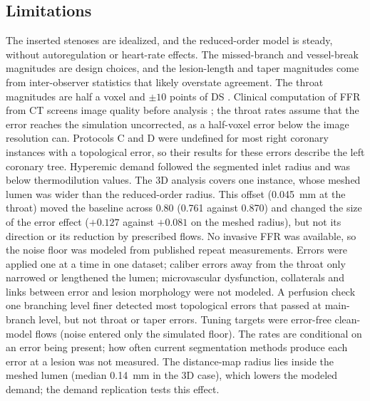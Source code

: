 \documentclass[journal,twoside,web]{ieeecolor}
\begin{document}
\subsection{Limitations}
The inserted stenoses are idealized, and the reduced-order model is steady, without autoregulation or heart-rate
effects. The missed-branch and vessel-break magnitudes are design choices, and the lesion-length and taper magnitudes come from
inter-observer statistics that likely overstate agreement. The throat magnitudes are half a voxel and $\pm 10$ points of DS \cite{boogers2010,gouya2009}. Clinical computation of FFR from CT screens image quality before analysis \cite{norgaard2014}; the throat rates assume that the error reaches the simulation uncorrected, as a half-voxel error below
the image resolution can. Protocols C and D were undefined for most right coronary
instances with a topological error, so their results for these errors describe the left coronary tree. Hyperemic
demand followed the segmented inlet radius and was below thermodilution values. The 3D analysis covers one instance, whose meshed lumen was wider than the reduced-order radius. This offset (0.045~mm at the throat) moved the baseline across 0.80 (0.761 against 0.870) and changed the size of the error effect ($+0.127$ against $+0.081$ on the meshed radius), but not its direction or its reduction by prescribed flows. No invasive FFR was available, so the noise floor was modeled from published repeat
measurements. Errors were applied one at a time in one dataset; caliber errors away from the throat only narrowed or lengthened the lumen; microvascular
dysfunction, collaterals and links between error and lesion morphology were not modeled. A perfusion check one
branching level finer detected most topological errors that passed at main-branch level, but not throat or taper
errors. Tuning targets were error-free clean-model flows
(noise entered only the simulated floor). The rates are conditional on an error being present; how often current
segmentation methods produce each error at a lesion was not measured. The distance-map radius lies inside the
meshed lumen (median 0.14~mm in the 3D case), which lowers the modeled demand; the demand replication tests this
effect.
\end{document}
